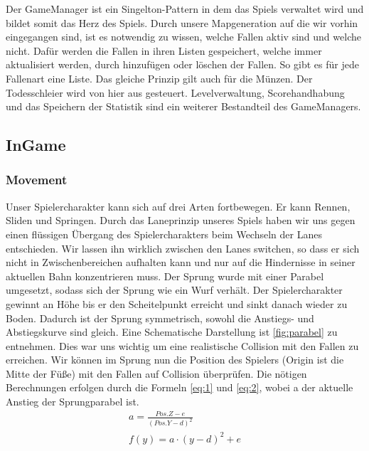 \documentclass[10pt]{article}
\begin{document}
\noindent Der GameManager ist ein Singelton-Pattern in dem das Spiels verwaltet wird und bildet somit das Herz des Spiels. Durch unsere Mapgeneration auf die wir
vorhin eingegangen sind, ist es notwendig zu wissen, welche Fallen aktiv sind und welche nicht. Dafür werden die Fallen in ihren Listen gespeichert, welche
immer aktualisiert werden, durch hinzufügen oder löschen der Fallen. So gibt es für jede Fallenart eine Liste. Das gleiche Prinzip gilt auch für die Münzen.
Der Todesschleier wird von hier aus gesteuert. Levelverwaltung, Scorehandhabung und das Speichern der Statistik sind ein weiterer Bestandteil des GameManagers.

\vspace{0.5cm}
\subsection{InGame}

\vspace{0.5cm}
\subsubsection{Movement}

Unser Spielercharakter kann sich auf drei Arten fortbewegen. Er kann Rennen, Sliden und Springen. Durch das Laneprinzip unseres Spiels haben wir uns gegen einen flüssigen Übergang des Spielercharakters beim Wechseln der Lanes
entschieden. Wir lassen ihn wirklich zwischen den Lanes switchen, so dass er sich nicht in Zwischenbereichen aufhalten kann und nur auf die Hindernisse in seiner aktuellen Bahn konzentrieren muss. \newline
Der Sprung wurde mit einer Parabel umgesetzt, sodass sich der Sprung wie ein Wurf verhält. Der Spielercharakter gewinnt an Höhe bis er den Scheitelpunkt
erreicht und sinkt danach wieder zu Boden. Dadurch ist der Sprung symmetrisch, sowohl die Anstiegs- und Abstiegskurve sind gleich. Eine Schematische Darstellung ist \ref{fig:parabel} zu entnehmen. Dies war uns wichtig um eine realistische Collision mit den Fallen zu erreichen. Wir können im Sprung nun die Position des Spielers (Origin ist die Mitte der Füße) mit den Fallen auf Collision überprüfen. Die nötigen Berechnungen erfolgen durch die Formeln \ref{eq:1} und \ref{eq:2}, wobei a der aktuelle Anstieg der Sprungparabel ist.
\begin{align}
a = \frac{Pos.Z - e}{(Pos.Y - d)^{2}}  \label{eq:1} \\
f(y) = a \cdot (y - d)^{2} + e  \label{eq:2}
\end{align}
\end{document}
